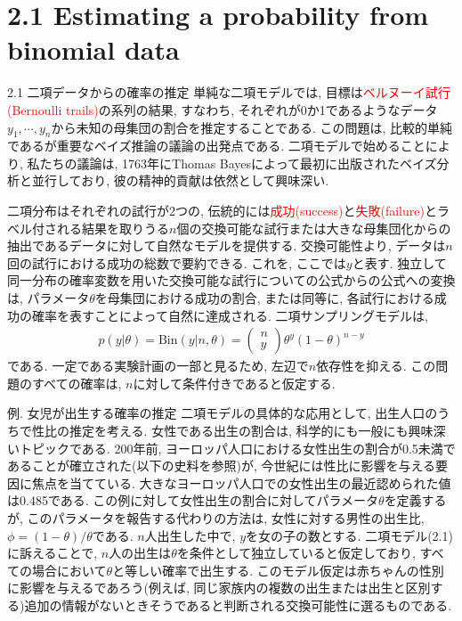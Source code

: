 \documentclass[10pt,dvipdfmx,a4]{beamer}
\newcommand{\eq}[1]{\begin{align}#1\end{align}}
\newcommand{\tcr}[1]{\textcolor{red}{#1}}
\begin{document}
\section{2.1 Estimating a probability from binomial data}
\begin{frame}{2.1 二項データからの確率の推定}
単純な二項モデルでは, 目標は\tcr{ベルヌーイ試行(Bernoulli trails)}の系列の結果, すなわち, それぞれが0か1であるようなデータ$y_1,\cdots,y_n$から未知の母集団の割合を推定することである.
この問題は, 比較的単純であるが重要なベイズ推論の議論の出発点である.
二項モデルで始めることにより, 私たちの議論は, 1763年にThomas Bayesによって最初に出版されたベイズ分析と並行しており, 彼の精神的貢献は依然として興味深い.

二項分布はそれぞれの試行が2つの, 伝統的には\tcr{成功(success)}と\tcr{失敗(failure)}とラベル付される結果を取りうる$n$個の交換可能な試行または大きな母集団化からの抽出であるデータに対して自然なモデルを提供する.
交換可能性より, データは$n$回の試行における成功の総数で要約できる.
これを, ここでは$y$と表す.
独立して同一分布の確率変数を用いた交換可能な試行についての公式からの公式への変換は, パラメータ$\theta$を母集団における成功の割合, または同等に, 各試行における成功の確率を表すことによって自然に達成される.
二項サンプリングモデルは,
\eq{p(y|\theta)=\text{Bin}(y|n,\theta)=\left(\begin{array}{c}n\\y\end{array}\right)\theta^y(1-\theta)^{n-y}}
である.
一定である実験計画の一部と見るため, 左辺で$n$依存性を抑える.
この問題のすべての確率は, $n$に対して条件付きであると仮定する.
\end{frame}


\begin{frame}{例. 女児が出生する確率の推定}
二項モデルの具体的な応用として, 出生人口のうちで性比の推定を考える.
女性である出生の割合は, 科学的にも一般にも興味深いトピックである.
200年前, ヨーロッパ人口における女性出生の割合が0.5未満であることが確立された(以下の史料を参照)が, 今世紀には性比に影響を与える要因に焦点を当てている.
大きなヨーロッパ人口での女性出生の最近認められた値は0.485である.
この例に対して女性出生の割合に対してパラメータ$\theta$を定義するが, このパラメータを報告する代わりの方法は, 女性に対する男性の出生比, $\phi=(1-\theta)/\theta$である.
$n$人出生した中で, $y$を女の子の数とする.
二項モデル(2.1)に訴えることで, $n$人の出生は$\theta$を条件として独立していると仮定しており, すべての場合において$\theta$と等しい確率で出生する.
このモデル仮定は赤ちゃんの性別に影響を与えるであろう(例えば, 同じ家族内の複数の出生または出生と区別する)追加の情報がないときそうであると判断される交換可能性に選るものである.
\end{frame}
\end{document}

